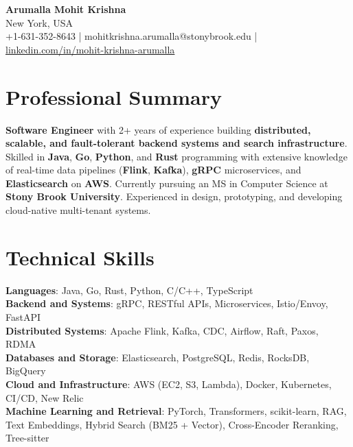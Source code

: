\documentclass[letterpaper,11pt]{article}
\begin{document}
\begin{center}
  {\Large \textbf{Arumalla Mohit Krishna}} \\
  New York, USA \\
  +1-631-352-8643 \enspace | \enspace mohitkrishna.arumalla@stonybrook.edu \enspace | \enspace \href{https://www.linkedin.com/in/mohit-krishna-arumalla}{linkedin.com/in/mohit-krishna-arumalla}
\end{center}

\section{Professional Summary}
  \begin{itemize}[leftmargin=0.15in, label={}]
    \small{\item{
     \textbf{Software Engineer} with 2+ years of experience building \textbf{distributed, scalable, and fault-tolerant backend systems and search infrastructure}. Skilled in \textbf{Java}, \textbf{Go}, \textbf{Python}, and \textbf{Rust} programming with extensive knowledge of real-time data pipelines (\textbf{Flink}, \textbf{Kafka}), \textbf{gRPC} microservices, and \textbf{Elasticsearch} on \textbf{AWS}. Currently pursuing an MS in Computer Science at \textbf{Stony Brook University}. Experienced in design, prototyping, and developing cloud-native multi-tenant systems.
    }}
  \end{itemize}
\vspace{-16pt}

\section{Technical Skills}
 \begin{itemize}[leftmargin=0.15in, label={}]
    \small{\item{
     \textbf{Languages}: Java, Go, Rust, Python, C/C++, TypeScript \\
     \textbf{Backend and Systems}: gRPC, RESTful APIs, Microservices, Istio/Envoy, FastAPI \\
     \textbf{Distributed Systems}: Apache Flink, Kafka, CDC, Airflow, Raft, Paxos, RDMA \\
     \textbf{Databases and Storage}: Elasticsearch, PostgreSQL, Redis, RocksDB, BigQuery \\
     \textbf{Cloud and Infrastructure}: AWS (EC2, S3, Lambda), Docker, Kubernetes, CI/CD, New Relic \\
     \textbf{Machine Learning and Retrieval}: PyTorch, Transformers, scikit-learn, RAG, Text Embeddings, Hybrid Search (BM25 + Vector), Cross-Encoder Reranking, Tree-sitter
    }}
 \end{itemize}
\vspace{-16pt}
\end{document}
